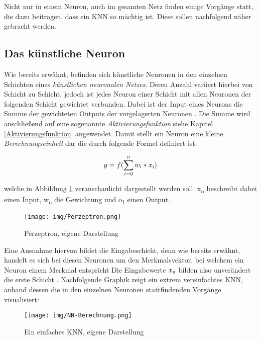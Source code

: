 Nicht nur in einem Neuron, auch im gesamten Netz finden einige Vorgänge statt, die dazu beitragen, dass ein KNN so mächtig ist. Diese sollen nachfolgend näher gebracht werden.

\subsection{Das künstliche Neuron}
\label{Neuron}
Wie bereits erwähnt, befinden sich künstliche Neuronen in den einzelnen Schichten eines \textit{künstlichen neuronalen Netzes}. Deren Anzahl variiert hierbei von Schicht zu Schicht, jedoch ist jedes Neuron einer Schicht mit allen Neuronen der folgenden Schicht gewichtet verbunden. Dabei ist der Input eines Neurons die Summe der gewichteten Outputs der vorgelagerten Neuronen \cite[vgl.][]{17}. Die Summe wird anschließend auf eine sogenannte \textit{Aktivierungsfunktion} {siehe Kapitel \ref{Aktivierungsfunktion}} angewendet. Damit stellt ein Neuron eine kleine \textit{Berechnungseinheit} dar \cite[vgl.][]{13} die durch folgende Formel definiert ist:

\begin{equation}
y = f(\sum_{i=0}^{n} w\textsubscript{i}*x\textsubscript{i})
\end{equation} 

welche in Abbildung \ref{fig:Perzeptron} veranschaulicht dargestellt werden soll. x\textsubscript{n} beschreibt dabei einen Input, w\textsubscript{n} die Gewichtung und o\textsubscript{1} einen Output. 

\begin{figure}[H]
	\centering
	\texttt{[image: img/Perzeptron.png]}
	\caption{Perzeptron, eigene Darstellung}
	\label{fig:Perzeptron}
\end{figure}

Eine Ausnahme hiervon bildet die Eingabeschicht, denn wie bereits erwähnt, handelt es sich bei diesen Neuronen um den Merkmalsvektor, bei welchem ein Neuron einem Merkmal entspricht \cite[vgl.][S.177]{14} 
Die Eingabewerte $x\textsubscript{n}$ bilden also unverändert die erste Schicht \cite[vgl.][S.178]{14} . Nachfolgende Graphik zeigt ein extrem vereinfachtes KNN, anhand dessen die in den einzelnen Neuronen stattfindenden Vorgänge visualisiert:

\begin{figure}[H]
	\centering
	\texttt{[image: img/NN-Berechnung.png]}
	\caption{Ein einfaches KNN, eigene Darstellung}
	\label{fig:NN-Berechnung}
\end{figure}

